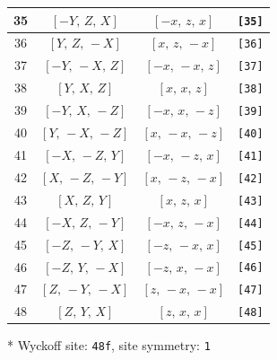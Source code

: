 \documentclass[fleqn,8pt]{jsarticle}
\begin{document}
\begin{longtable}{cccc}
35 & $\left[ - Y,\, Z,\, X \right]$ & $\left[ - x,\, z,\, x \right]$ & {\tt [35]} \\ \hline
36 & $\left[ Y,\, Z,\, - X \right]$ & $\left[ x,\, z,\, - x \right]$ & {\tt [36]} \\ \hline
37 & $\left[ - Y,\, - X,\, Z \right]$ & $\left[ - x,\, - x,\, z \right]$ & {\tt [37]} \\ \hline
38 & $\left[ Y,\, X,\, Z \right]$ & $\left[ x,\, x,\, z \right]$ & {\tt [38]} \\ \hline
39 & $\left[ - Y,\, X,\, - Z \right]$ & $\left[ - x,\, x,\, - z \right]$ & {\tt [39]} \\ \hline
40 & $\left[ Y,\, - X,\, - Z \right]$ & $\left[ x,\, - x,\, - z \right]$ & {\tt [40]} \\ \hline
41 & $\left[ - X,\, - Z,\, Y \right]$ & $\left[ - x,\, - z,\, x \right]$ & {\tt [41]} \\ \hline
42 & $\left[ X,\, - Z,\, - Y \right]$ & $\left[ x,\, - z,\, - x \right]$ & {\tt [42]} \\ \hline
43 & $\left[ X,\, Z,\, Y \right]$ & $\left[ x,\, z,\, x \right]$ & {\tt [43]} \\ \hline
44 & $\left[ - X,\, Z,\, - Y \right]$ & $\left[ - x,\, z,\, - x \right]$ & {\tt [44]} \\ \hline
45 & $\left[ - Z,\, - Y,\, X \right]$ & $\left[ - z,\, - x,\, x \right]$ & {\tt [45]} \\ \hline
46 & $\left[ - Z,\, Y,\, - X \right]$ & $\left[ - z,\, x,\, - x \right]$ & {\tt [46]} \\ \hline
47 & $\left[ Z,\, - Y,\, - X \right]$ & $\left[ z,\, - x,\, - x \right]$ & {\tt [47]} \\ \hline
48 & $\left[ Z,\, Y,\, X \right]$ & $\left[ z,\, x,\, x \right]$ & {\tt [48]} \\
\end{longtable}
* Wyckoff site: {\tt 48f}, site symmetry: {\tt 1}
\renewcommand{\arraystretch}{1.2}
\end{document}
